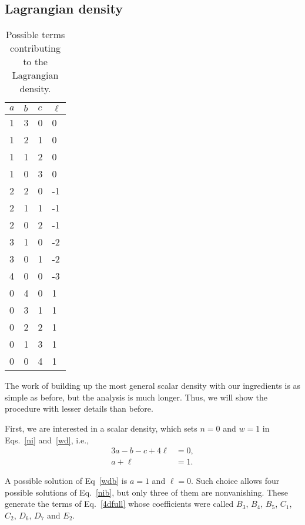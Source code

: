 \subsection{Lagrangian density}

\begin{table}
  \caption{Possible terms contributing to the Lagrangian density.}
  \label{tab:ld}
  \begin{tabular}{|C{.23\linewidth}C{.23\linewidth}C{.23\linewidth}C{.23\linewidth}|}
    \hline
    $a$ & $b$ & $c$ & $\ell$ \\
     & 3 & 0 & 0\\
    1 & 2 & 1 & 0\\
    1 & 1 & 2 & 0\\
    1 & 0 & 3 & 0\\
    2 & 2 & 0 & -1\\
    2 & 1 & 1 & -1\\
    2 & 0 & 2 & -1\\
    3 & 1 & 0 & -2\\
    3 & 0 & 1 & -2\\
    4 & 0 & 0 & -3\\
    0 & 4 & 0 & 1\\
    0 & 3 & 1 & 1\\
    0 & 2 & 2 & 1\\
    0 & 1 & 3 & 1\\
    0 & 0 & 4 & 1\\
    \hline
  \end{tabular}
\end{table}

The work of building up the most general scalar density with our ingredients is as simple as before, but the analysis is much longer. Thus, we will show the procedure with lesser details than before.

First, we are interested in a scalar density, which sets $n = 0$ and $w = 1$ in Eqs.~\eqref{ni} and~\eqref{wd}, i.e.,
\begin{align}
  3a -b -c  + 4\ell &= 0, \label{nib}\\
  a + \ell &= 1. \label{wdb}
\end{align}

A possible solution of Eq~\eqref{wdb} is $a=1$ and $\ell = 0$. Such choice allows four possible solutions of Eq.~\eqref{nib}, but only three of them are nonvanishing. These generate the terms of Eq.~\eqref{4dfull} whose coefficients were called $B_3$, $B_4$, $B_5$, $C_1$, $C_2$, $D_6$, $D_7$ and $E_2$.

